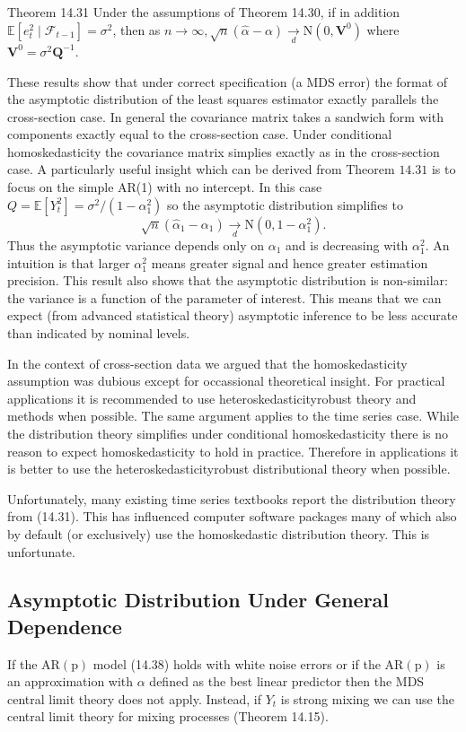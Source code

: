 \documentclass[10pt]{article}
\begin{document}
Theorem 14.31 Under the assumptions of Theorem 14.30, if in addition $\mathbb{E}\left[e_{t}^{2} \mid \mathscr{F}_{t-1}\right]=\sigma^{2}$, then as $n \rightarrow \infty, \sqrt{n}(\widehat{\alpha}-\alpha) \underset{d}{\longrightarrow} \mathrm{N}\left(0, \boldsymbol{V}^{0}\right)$ where $\boldsymbol{V}^{0}=\sigma^{2} \boldsymbol{Q}^{-1}$.

These results show that under correct specification (a MDS error) the format of the asymptotic distribution of the least squares estimator exactly parallels the cross-section case. In general the covariance matrix takes a sandwich form with components exactly equal to the cross-section case. Under conditional homoskedasticity the covariance matrix simplies exactly as in the cross-section case. A particularly useful insight which can be derived from Theorem $14.31$ is to focus on the simple AR(1) with no intercept. In this case $Q=\mathbb{E}\left[Y_{t}^{2}\right]=\sigma^{2} /\left(1-\alpha_{1}^{2}\right)$ so the asymptotic distribution simplifies to
$$
\sqrt{n}\left(\widehat{\alpha}_{1}-\alpha_{1}\right) \underset{d}{\longrightarrow} \mathrm{N}\left(0,1-\alpha_{1}^{2}\right) .
$$
Thus the asymptotic variance depends only on $\alpha_{1}$ and is decreasing with $\alpha_{1}^{2}$. An intuition is that larger $\alpha_{1}^{2}$ means greater signal and hence greater estimation precision. This result also shows that the asymptotic distribution is non-similar: the variance is a function of the parameter of interest. This means that we can expect (from advanced statistical theory) asymptotic inference to be less accurate than indicated by nominal levels.

In the context of cross-section data we argued that the homoskedasticity assumption was dubious except for occassional theoretical insight. For practical applications it is recommended to use heteroskedasticityrobust theory and methods when possible. The same argument applies to the time series case. While the distribution theory simplifies under conditional homoskedasticity there is no reason to expect homoskedasticity to hold in practice. Therefore in applications it is better to use the heteroskedasticityrobust distributional theory when possible.

Unfortunately, many existing time series textbooks report the distribution theory from (14.31). This has influenced computer software packages many of which also by default (or exclusively) use the homoskedastic distribution theory. This is unfortunate.

\subsection{Asymptotic Distribution Under General Dependence}
If the $\mathrm{AR}(\mathrm{p})$ model (14.38) holds with white noise errors or if the $\mathrm{AR}(\mathrm{p})$ is an approximation with $\alpha$ defined as the best linear predictor then the MDS central limit theory does not apply. Instead, if $Y_{t}$ is strong mixing we can use the central limit theory for mixing processes (Theorem 14.15).
\end{document}
